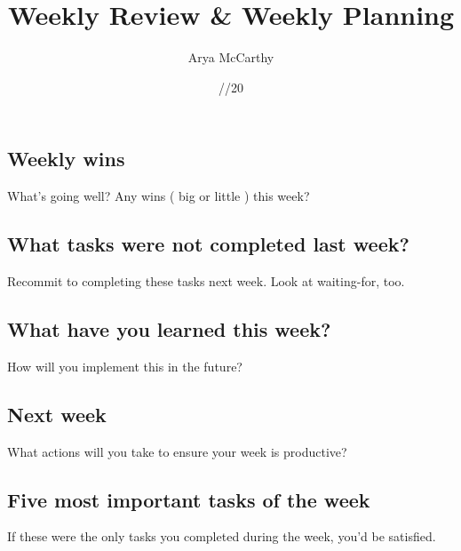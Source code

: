 \documentclass[11pt, oneside, twocolumn]{article}   	%
\title{Weekly Review \& Weekly Planning}
\author{Arya McCarthy}
\date{\underline{\hspace{2ex}}/\underline{\hspace{2ex}}/20\underline{\hspace{2ex}}}							%
\begin{document}
\maketitle
\subsection*{Weekly wins}
\vspace{-0.9em}
{\footnotesize What's going well? Any wins ( big or little ) this week?}

\hrulefill

\hrulefill

\hrulefill

\hrulefill

\subsection*{What tasks were not completed last week?}
\vspace{-0.9em}
{\footnotesize Recommit to completing these tasks next week. Look at waiting-for, too.}

\hrulefill

\hrulefill

\hrulefill

\hrulefill

\hrulefill

\hrulefill


\subsection*{What have you learned this week?}
\vspace{-0.9em}
{\footnotesize How will you implement this in the future?}

\hrulefill

\hrulefill

\hrulefill


\subsection*{Next week}
\vspace{-0.9em}
{\footnotesize What actions will you take to ensure your week is productive?}

\hrulefill

\hrulefill

\hrulefill

\newpage

\subsection*{Five most important tasks of the week}
\vspace{-0.9em}
{\footnotesize If these were the only tasks you completed during the week, you'd be satisfied.}
\end{document}
